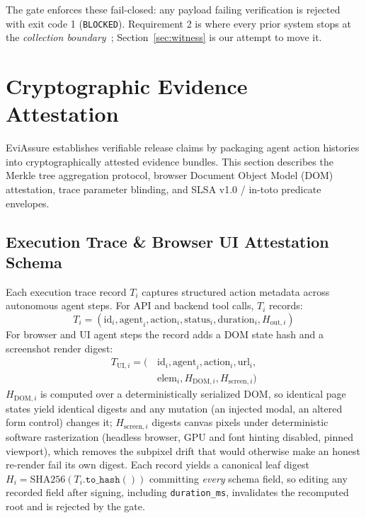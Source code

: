 \documentclass[letterpaper,10pt,twocolumn]{article}
\theoremstyle{definition}
\begin{document}
The gate enforces these fail-closed: any payload failing verification is rejected with exit code 1 (\texttt{BLOCKED}). Requirement 2 is where every prior system stops at the \emph{collection boundary}~\cite{apas2026agent-provenance, aas12026agent-audit}; Section~\ref{sec:witness} is our attempt to move it.

\section{Cryptographic Evidence Attestation}
EviAssure establishes verifiable release claims by packaging agent action histories into cryptographically attested evidence bundles. This section describes the Merkle tree aggregation protocol, browser Document Object Model (DOM) attestation, trace parameter blinding, and SLSA v1.0 / in-toto predicate envelopes.

\subsection{Execution Trace \& Browser UI Attestation Schema}
Each execution trace record $T_i$ captures structured action metadata across autonomous agent steps. For API and backend tool calls, $T_i$ records:
\begin{equation}
T_i = (\text{id}_i, \text{agent}_i, \text{action}_i, \text{status}_i, \text{duration}_i, H_{\text{out},i})
\end{equation}
For browser and UI agent steps the record adds a DOM state hash and a screenshot render digest:
\begin{equation}
\begin{split}
T_{\text{UI},i} = (\,&\text{id}_i, \text{agent}_i, \text{action}_i, \text{url}_i,\\
&\text{elem}_i, H_{\text{DOM},i}, H_{\text{screen},i})
\end{split}
\end{equation}
$H_{\text{DOM},i}$ is computed over a deterministically serialized DOM, so identical page states yield identical digests and any mutation  (an injected modal, an altered form control)  changes it; $H_{\text{screen},i}$ digests canvas pixels under deterministic software rasterization (headless browser, GPU and font hinting disabled, pinned viewport), which removes the subpixel drift that would otherwise make an honest re-render fail its own digest. Each record yields a canonical leaf digest $H_i = \text{SHA256}(T_i.\texttt{to\_hash}())$ committing \emph{every} schema field, so editing any recorded field after signing, including \texttt{duration\_ms}, invalidates the recomputed root and is rejected by the gate.
\end{document}
